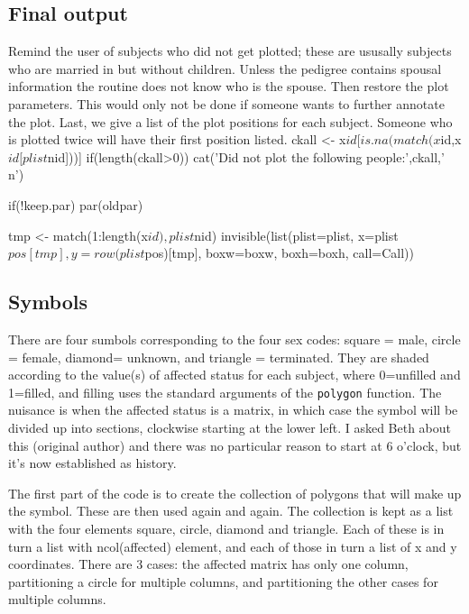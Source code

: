 \documentclass{article}
\begin{document}
\begin{enumerate}
\subsection{Final output}
Remind the user of subjects who did not get
plotted; these are ususally subjects who are married in but without
children.  Unless the pedigree contains spousal information the
routine does not know who is the spouse.
Then restore the plot parameters.  This would only not be done if someone
wants to further annotate the plot.
Last, we give a list of the plot positions for each subject.  Someone
who is plotted twice will have their first position listed.
\nwenddocs{}\endmoddef
ckall <- x$id[is.na(match(x$id,x$id[plist$nid]))]
if(length(ckall>0)) cat('Did not plot the following people:',ckall,'\\n')
    
if(!keep.par) par(oldpar)

tmp <- match(1:length(x$id), plist$nid)
invisible(list(plist=plist, x=plist$pos[tmp], y= row(plist$pos)[tmp],
               boxw=boxw, boxh=boxh, call=Call))        
\nwendcode{}\nwdocspar
\subsection{Symbols}
There are four sumbols corresponding to the four sex codes: square = male,
circle = female, diamond= unknown, and triangle = terminated.  
They are shaded according to the value(s) of affected status for each
subject, where 0=unfilled and 1=filled, and filling uses the standard
arguments of the {\tt{}polygon} function.
The nuisance is when the affected status is a matrix, in which case the
symbol will be divided up into sections, clockwise starting at the 
lower left. 
I asked Beth about this (original author) and there was no particular
reason to start at 6 o'clock, but it's now established as history.

The first part of the code is to create the collection of polygons that
will make up the symbol.  These are then used again and again.
The collection is kept as a list with the four elements square, circle,
diamond and triangle.  
Each of these is in turn a list with ncol(affected) element, and each
of those in turn a list of x and y coordinates.
There are 3 cases: the affected matrix has
only one column, partitioning a circle for multiple columns, and 
partitioning the other cases for multiple columns.


\end{enumerate}
\end{document}
